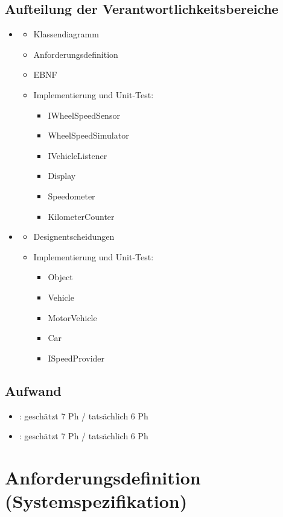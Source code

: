 \subsection{Aufteilung der Verantwortlichkeitsbereiche}
\begin{itemize}
	\item \docauthor
	\begin{itemize}
		\item Klassendiagramm
		\item Anforderungsdefinition
		\item EBNF
		\item Implementierung und Unit-Test:
		\begin{itemize}
			\item IWheelSpeedSensor
			\item WheelSpeedSimulator
			\item IVehicleListener
			\item Display
			\item Speedometer
			\item KilometerCounter
		\end{itemize}
	\end{itemize}
	\item \doccoauthor
	\begin{itemize}
		\item Designentscheidungen
		\item Implementierung und Unit-Test:
		\begin{itemize}
			\item Object
			\item Vehicle
			\item MotorVehicle
			\item Car
			\item ISpeedProvider
		\end{itemize}
	\end{itemize}	
\end{itemize}

\subsection{Aufwand}

\begin{itemize}
	\item \docauthor: geschätzt 7 Ph / tatsächlich 6 Ph
	\item \doccoauthor: geschätzt 7 Ph / tatsächlich 6 Ph
\end{itemize}

\section{Anforderungsdefinition (Systemspezifikation)}
 
